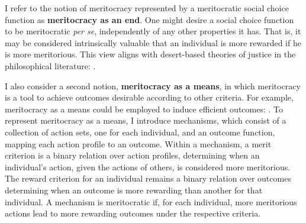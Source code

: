 I refer to the notion of meritocracy represented by a meritocratic social choice function as \textbf{meritocracy as an end}. One might desire a social choice function to be meritocratic \emph{per se}, independently of any other properties it has. That is, it may be considered intrinsically valuable that an individual is more rewarded if he is more meritorious. This view aligns with desert-based theories of justice in the philosophical literature:  \citep[p. 5]{kaganGeometryDesert2014}.

I also consider a second notion, \textbf{meritocracy as a means}, in which meritocracy is a tool to achieve outcomes desirable according to other criteria. For example, meritocracy as a means could be employed to induce efficient outcomes:  \citep[p. 1]{morganLimitsMeritocracy2022}. To represent meritocracy as a means, I introduce mechanisms, which consist of a collection of action sets, one for each individual, and an outcome function, mapping each action profile to an outcome. Within a mechanism, a merit criterion is a binary relation over action profiles, determining when an individual's action, given the actions of others, is considered more meritorious. The reward criterion for an individual remains a binary relation over outcomes determining when an outcome is more rewarding than another for that individual. A mechanism is meritocratic if, for each individual, more meritorious actions lead to more rewarding outcomes under the respective criteria.

